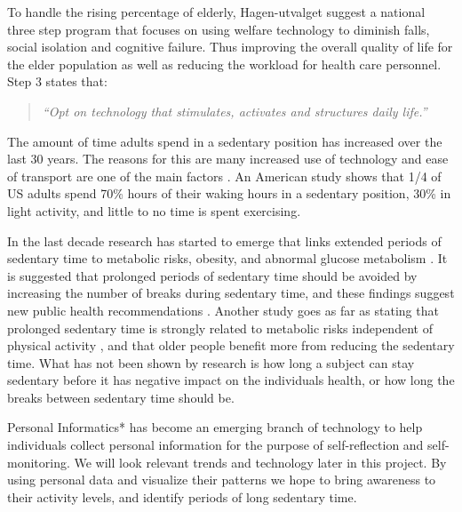 To handle the rising percentage of elderly, Hagen-utvalget suggest a national three step program that focuses on using welfare technology to diminish falls, social isolation and cognitive failure. Thus improving the overall quality of life for the elder population as well as reducing the workload for health care personnel. 
Step 3 states that:
\begin{quote}
\textit{``Opt on technology that stimulates, activates and structures daily life.''}
\end{quote}

The amount of time adults spend in a sedentary position has increased over the last 30 years. The reasons for this are many increased use of technology and ease of transport are one of the main factors \cite{sedentaryBehaviour}. An American study shows that 1/4 of US adults spend 70\% hours of their waking hours in a sedentary position, 30\% in light activity, and little to no time is spent exercising.

In the last decade research has started to emerge that links extended periods of sedentary time to metabolic risks\cite{sedentaryTime}, obesity, and abnormal glucose metabolism \cite{breaksSedentary}. It is suggested that prolonged periods of sedentary time should be avoided by increasing the number of breaks during sedentary time, and these findings suggest new public health recommendations \cite{breaksSedentary}. Another study goes as far as stating that prolonged sedentary time is strongly related to metabolic risks independent of physical activity \cite{sedentaryActivity}, and that older people benefit more from reducing the sedentary time. What has not been shown by research is how long a subject can stay sedentary before it has negative impact on the individuals health, or how long the breaks between sedentary time should be.

Personal Informatics* has become an emerging branch of technology to help individuals collect personal information for the purpose of self-reflection and self-monitoring. We will look relevant trends and technology later in this project. By using personal data and visualize their patterns we hope to bring awareness to their activity levels, and identify periods of long sedentary time. 





